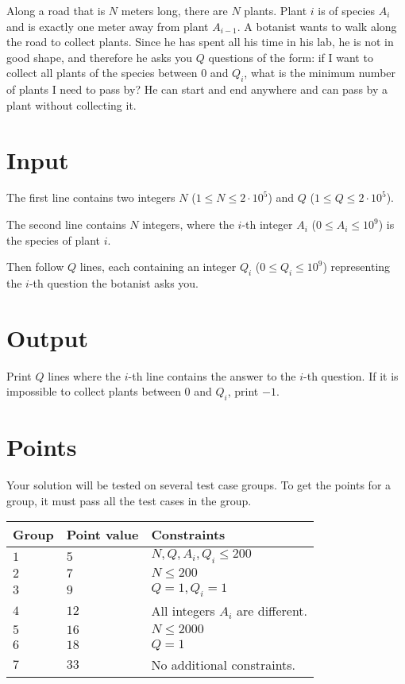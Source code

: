 \noindent
Along a road that is $N$ meters long, there are $N$ plants. Plant $i$ is of species $A_i$ and is exactly one meter away from plant $A_{i-1}$. A botanist wants to walk along the road to collect plants. Since he has spent all his time in his lab, he is not in good shape, and therefore he asks you $Q$ questions of the form: if I want to collect all plants of the species between $0$ and $Q_i$, what is the minimum number of plants I need to pass by? He can start and end anywhere and can pass by a plant without collecting it.

\section*{Input}
The first line contains two integers $N$ ($1 \leq N \leq 2 \cdot 10^5$) and $Q$ ($1 \leq Q \leq 2 \cdot 10^5$).

The second line contains $N$ integers, where the $i$-th integer $A_i$ ($0 \le A_i \le 10^9$) is the species of plant $i$.

Then follow $Q$ lines, each containing an integer $Q_i$ ($0 \leq Q_i \leq 10^9$) representing the $i$-th question the botanist asks you.

\section*{Output}
Print $Q$ lines where the $i$-th line contains the answer to the $i$-th question. If it is impossible to collect plants between $0$ and $Q_i$, print $-1$.

\section*{Points}
Your solution will be tested on several test case groups.
To get the points for a group, it must pass all the test cases in the group.

\noindent
\begin{tabular}{| l | l | l |}
  \hline
  \textbf{Group} & \textbf{Point value} & \textbf{Constraints} \\ \hline
  $1$   & $5$       & $N, Q, A_i, Q_i \leq 200 $\\ \hline
  $2$   & $7$       & $N \leq 200 $\\ \hline
  $3$   & $9$       & $Q=1, Q_i=1$\\ \hline
  $4$   & $12$       & All integers $A_i$ are different. \\ \hline
  $5$   & $16$       & $N \leq 2000 $  \\ \hline
  $6$   & $18$       & $Q = 1$ \\ \hline
  $7$   & $33$       & No additional constraints. \\ \hline
\end{tabular}
